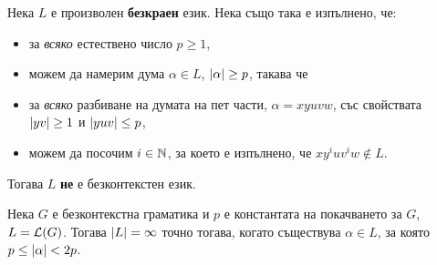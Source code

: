 \begin{cor}
  \label{cor:pumping-context-free}
  Нека $L$ е произволен {\bf безкраен} език. Нека също така е изпълнено, че:
  \begin{itemize}
  \item 
    за {\em всяко} естествено число $p \geq 1$,
  \item
    можем да намерим дума $\alpha \in L$, $\lvert{\alpha}\rvert\geq p$, такава че
  \item
    за {\em всяко} разбиване на думата на пет части, $\alpha = xyuvw$, със свойствата $\lvert{yv}\rvert \geq 1$ и $\lvert{yuv}\rvert \leq p$,
  \item
    можем да посочим $i \in \mathbb{N}$, за което е изпълнено, че $xy^iuv^iw \not\in L$.
  \end{itemize}  
  Тогава $L$ {\bf не} е безконтекстен език.
\end{cor}

\begin{cor}
  Нека $G$ е безконтекстна граматика и $p$ е константата на покачването за $G$, $L = \mathcal{L}(G)$.
  Тогава $\lvert{L}\rvert = \infty$ точно тогава, когато съществува $\alpha \in L$, за която $p \leq \lvert{\alpha}\rvert < 2p$.
\end{cor}




